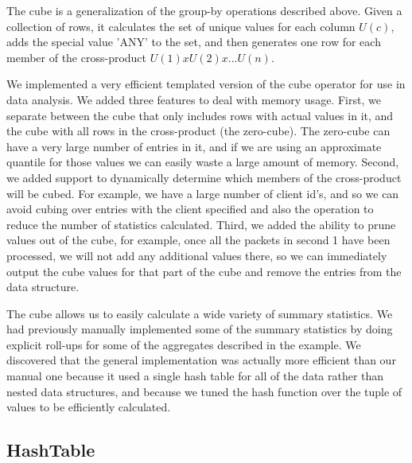 The cube\cite{gray97cube} is a generalization of the group-by
operations described above.  Given a collection of rows, it calculates
the set of unique values for each column $U(c)$, adds the special
value 'ANY' to the set, and then generates one row for each member of
the cross-product $U(1) x U(2) x ... U(n)$.

We implemented a very efficient templated version of the cube operator
for use in data analysis.  We added three features to deal with memory
usage.  First, we separate between the cube that only includes rows
with actual values in it, and the cube with all rows in the
cross-product (the zero-cube).  The zero-cube can have a very large
number of entries in it, and if we are using an approximate quantile
for those values we can easily waste a large amount of memory.
Second, we added support to dynamically determine which members of the
cross-product will be cubed.  For example, we have a large number of
client id's, and so we can avoid cubing over entries with the client
specified and also the operation to reduce the number of statistics
calculated.  Third, we added the ability to prune values out of the
cube, for example, once all the packets in second 1 have been
processed, we will not add any additional values there, so we can
immediately output the cube values for that part of the cube and
remove the entries from the data structure.

The cube allows us to easily calculate a wide variety of summary
statistics.  We had previously manually implemented some of the
summary statistics by doing explicit roll-ups for some of the
aggregates described in the example.  We discovered that the general
implementation was actually more efficient than our manual one because
it used a single hash table for all of the data rather than nested
data structures, and because we tuned the hash function over the tuple
of values to be efficiently calculated.

\subsection{HashTable}

